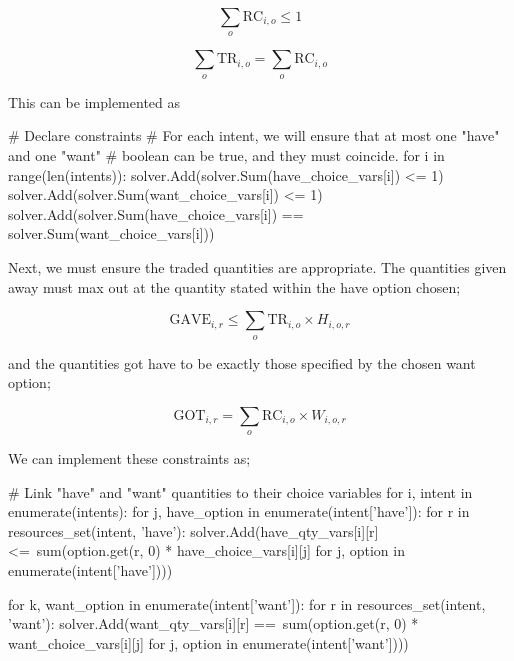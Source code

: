 \begin{equation}
    \sum_o \text{RC}_{i, o} \leq 1
\end{equation}

\begin{equation}
    \sum_o \text{TR}_{i, o} = \sum_o \text{RC}_{i, o}
\end{equation}

This can be implemented as

\begin{betterpython}
# Declare constraints
# For each intent, we will ensure that at most one "have" and one "want"
# boolean can be true, and they must coincide.
for i in range(len(intents)):
    solver.Add(solver.Sum(have_choice_vars[i]) <= 1)
    solver.Add(solver.Sum(want_choice_vars[i]) <= 1)
    solver.Add(solver.Sum(have_choice_vars[i]) == solver.Sum(want_choice_vars[i]))
\end{betterpython}

Next, we must ensure the traded quantities are appropriate. The quantities given away must max out at the quantity stated within the have option chosen;

\begin{equation}
    \text{GAVE}_{i, r} \leq \sum_{o} \text{TR}_{i, o} \times H_{i, o, r}
\end{equation}

and the quantities got have to be exactly those specified by the chosen want option;

\begin{equation}
    \text{GOT}_{i, r} = \sum_{o} \text{RC}_{i, o} \times W_{i, o, r}
\end{equation}

We can implement these constraints as;

\begin{betterpython}
# Link "have" and "want" quantities to their choice variables
for i, intent in enumerate(intents):
    for j, have_option in enumerate(intent['have']):
        for r in resources_set(intent, 'have'):
            solver.Add(have_qty_vars[i][r] <=\
                sum(option.get(r, 0) * have_choice_vars[i][j]
                    for j, option in enumerate(intent['have'])))
    
    for k, want_option in enumerate(intent['want']):
        for r in resources_set(intent, 'want'):
            solver.Add(want_qty_vars[i][r] ==\
                sum(option.get(r, 0) * want_choice_vars[i][j] 
                    for j, option in enumerate(intent['want'])))
\end{betterpython}

